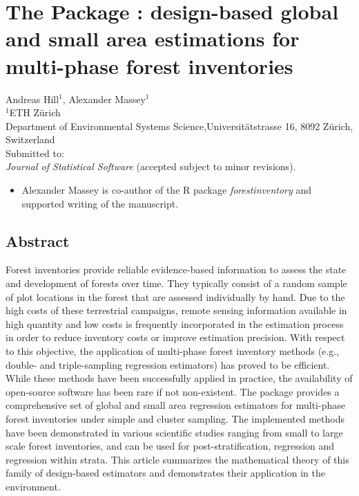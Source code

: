 \chapter{The  Package : design-based global and small area estimations for multi-phase forest inventories}
\label{chap:rpack}
{\large Andreas Hill$^1$, Alexander Massey$^1$}\\

\vspace{3cm}
\noindent
$^1$ETH Z\"urich\\Department of Environmental Systems Science,Universit\"atstrasse 16, 8092 Z\"urich, Switzerland \\

\vspace{\fill}
\noindent
Submitted to:\\
\textit{Journal of Statistical Software} (accepted subject to minor revisions).

\newpage
\thispagestyle{plain}
\renewcommand{\labelitemi}{--}
\begin{itemize}
	\item Alexander Massey is co-author of the R package \textit{forestinventory} and supported writing of the manuscript.
\end{itemize}

\clearpage
\section*{Abstract}
\label{chap:rpack:Abstract}
Forest inventories provide reliable evidence-based information to assess the state and development of forests over time.  They typically consist of a random sample of plot locations in the forest that are assessed individually by hand. Due to the high costs of these terrestrial campaigns, remote sensing information available in high quantity and low costs is frequently incorporated in the estimation process in order to reduce inventory costs or improve estimation precision. With respect to this objective, the application of multi-phase forest inventory methods (e.g., double- and triple-sampling regression estimators) has proved to be efficient. While these methods have been successfully applied in practice, the availability of open-source software has been rare if not non-existent. The  package  provides a comprehensive set of global and small area regression estimators for multi-phase forest inventories under simple and cluster sampling. The implemented methods have been demonstrated in various scientific studies ranging from small to large scale forest inventories, and can be used for post-stratification, regression and regression within strata. This article summarizes the mathematical theory of this family of design-based estimators and demonstrates their application in the  environment.


